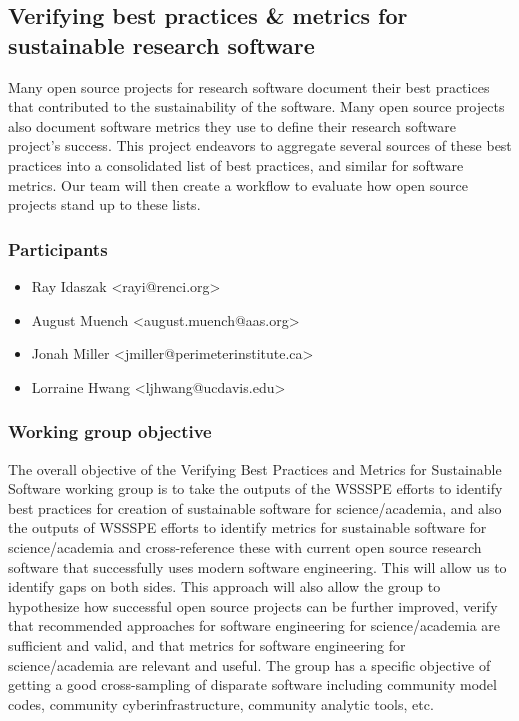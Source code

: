 \subsection{Verifying best practices \& metrics for sustainable research software}
\label{sec:best-practices-sustainable}


Many open source projects for research software document their best practices that contributed to the sustainability of the software.  Many open source projects also document software metrics they use to define their research software project's success.  This project endeavors to aggregate several sources of these best practices into a consolidated list of best practices, and similar for software metrics.  Our team will then create a workflow to evaluate how open source projects stand up to these lists.

\subsubsection{Participants}

\begin{itemize}
\item Ray Idaszak <rayi@renci.org>
\item August Muench <august.muench@aas.org>
\item Jonah Miller <jmiller@perimeterinstitute.ca>
\item Lorraine Hwang <ljhwang@ucdavis.edu>
\end{itemize}

\subsubsection{Working group objective}

The overall objective of the Verifying Best Practices and Metrics for Sustainable Software working group is to take the outputs of the WSSSPE efforts to identify best practices for creation of sustainable software for science/academia, and also the outputs of WSSSPE efforts to identify metrics for sustainable software for science/academia and cross-reference these with current open source research software that successfully uses modern software engineering.  This will allow us to identify gaps on both sides.  This approach will also allow the group to  hypothesize how successful open source projects can be further improved, verify that recommended approaches for software engineering for science/academia are sufficient and valid, and that metrics for software engineering for science/academia are relevant and useful.  The group has a specific objective of getting a good cross-sampling of disparate software including community model codes, community cyberinfrastructure, community analytic tools, etc.

